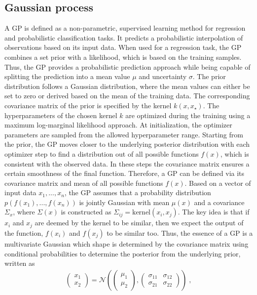 \documentclass[11pt,a4paper]{article}
\begin{document}
\subsection{Gaussian process}
\label{sec:GP}
%
A GP is defined as a non-parametric, supervised learning method for regression and probabilistic classification tasks. It predicts a probabilistic interpolation of observations based on its input data. When used for a regression task, the GP combines a set prior with a likelihood, which is based on the training samples. Thus, the GP provides a probabilistic prediction approach while being capable of splitting the prediction into a mean value $\mu$ and uncertainty $\sigma$. The prior distribution follows a Gaussian distribution, where the mean values can either be set to zero or derived based on the mean of the training data. The corresponding covariance matrix of the prior is specified by the kernel $k(x, x_\star)$. The hyperparameters of the chosen kernel $k$ are optimized during the training using a maximum log-marginal likelihood approach. At initialization, the optimizer parameters are sampled from the allowed hyperparameter range. 
Starting from the prior, the GP moves closer to the underlying posterior distribution with each optimizer step to find a distribution out of all possible functions $f(x)$, which is consistent with the observed data.
In these steps the covariance matrix ensures a certain smoothness of the final function. 
Therefore, a GP can be defined via its covariance matrix and mean of all possible functions $f(x)$.
Based on a vector of input data $x_1, ..., x_n$, the GP assumes that a probability distribution $p(f(x_1),...,f(x_n))$ is jointly Gaussian with mean $\mu(x)$ and a covariance $\Sigma_{x}$, where $\Sigma(x)$ is constructed as $\Sigma_{ij}=\text{kernel}(x_i,x_j)$.
The key idea is that if $x_i$ and $x_j$ are deemed by the kernel to be similar, then we expect the output of the function, $f(x_i)$ and $f(x_j)$ to be similar too.
Thus, the essence of a GP is a multivariate Gaussian which shape is determined by the covariance matrix using conditional probabilities to determine the posterior from the underlying prior, written as
%
\begin{align}
    \begin{pmatrix}%
    x_1 \\ x_2
    \end{pmatrix}
    = \mathcal{N} \left(
    \begin{pmatrix}
    \mu_1 \\ \mu_2
    \end{pmatrix}
    ,
    \begin{pmatrix}
    \sigma_{11} & \sigma_{12}\\ \sigma_{21} & \sigma_{22}
    \end{pmatrix}
    \right) \;,
\end{align}
\end{document}
